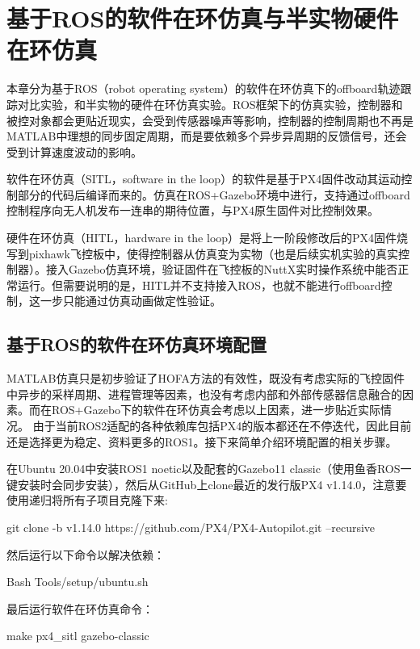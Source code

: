\chapter{基于ROS的软件在环仿真与半实物硬件在环仿真}
本章分为基于ROS（robot operating system）的软件在环仿真下的offboard轨迹跟踪对比实验，和半实物的硬件在环仿真实验。ROS框架下的仿真实验，控制器和被控对象都会更贴近现实，会受到传感器噪声等影响，控制器的控制周期也不再是MATLAB中理想的同步固定周期，而是要依赖多个异步异周期的反馈信号，还会受到计算速度波动的影响。

软件在环仿真（SITL，software in the loop）的软件是基于PX4固件改动其运动控制部分的代码后编译而来的。仿真在ROS+Gazebo环境中进行，支持通过offboard控制程序向无人机发布一连串的期待位置，与PX4原生固件对比控制效果。

硬件在环仿真（HITL，hardware in the loop）是将上一阶段修改后的PX4固件烧写到pixhawk飞控板中，使得控制器从仿真变为实物（也是后续实机实验的真实控制器）。接入Gazebo仿真环境，验证固件在飞控板的NuttX实时操作系统中能否正常运行。但需要说明的是，HITL并不支持接入ROS，也就不能进行offboard控制，这一步只能通过仿真动画做定性验证。

\section{基于ROS的软件在环仿真环境配置}
MATLAB仿真只是初步验证了HOFA方法的有效性，既没有考虑实际的飞控固件中异步的采样周期、进程管理等因素，也没有考虑内部和外部传感器信息融合的因素。而在ROS+Gazebo下的软件在环仿真会考虑以上因素，进一步贴近实际情况。
由于当前ROS2适配的各种依赖库包括PX4的版本都还在不停迭代，因此目前还是选择更为稳定、资料更多的ROS1。接下来简单介绍环境配置的相关步骤。

在Ubuntu 20.04中安装ROS1 noetic以及配套的Gazebo11 classic（使用鱼香ROS一键安装\cite{fishros}时会同步安装），然后从GitHub上clone最近的发行版PX4 v1.14.0，注意要使用递归将所有子项目克隆下来:
\begin{codeblock}[language=C]
  git clone -b v1.14.0 https://github.com/PX4/PX4-Autopilot.git --recursive
\end{codeblock}
然后运行以下命令以解决依赖：
\begin{codeblock}[language=C]
  Bash Tools/setup/ubuntu.sh
\end{codeblock}
最后运行软件在环仿真命令：
\begin{codeblock}[language=C]
  make px4_sitl gazebo-classic
\end{codeblock}

